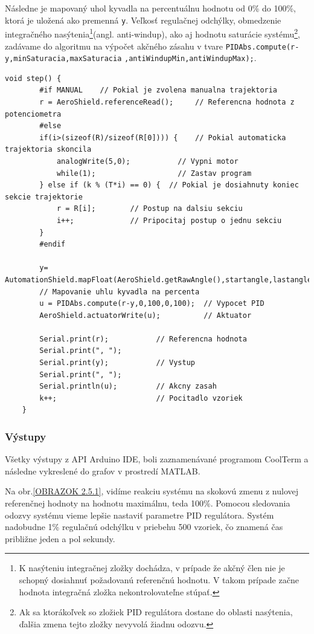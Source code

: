 Následne je mapovaný uhol kyvadla na percentuálnu hodnotu od 0\% do 100\%, ktorá je uložená ako premenná \verb|y|. Veľkosť regulačnej odchýlky, obmedzenie integračného nasýtenia\footnote[11]{K nasýteniu integračnej zložky dochádza, v prípade že akčný člen nie je schopný dosiahnuť požadovanú referenčnú
	hodnotu. V takom prípade začne hodnota integračná zložka nekontrolovateľne stúpať.}(angl. anti-windup), ako aj hodnotu saturácie systému\footnote[12]{Ak sa ktorákoľvek so zložiek PID regulátora dostane do oblasti nasýtenia, ďalšia zmena tejto zložky nevyvolá žiadnu odozvu.}, zadávame do algoritmu na výpočet akčného zásahu v tvare \verb|PIDAbs.compute(r-y,minSaturacia,maxSaturacia|
\verb|,antiWindupMin,antiWindupMax);|. 


\begin{lstlisting}[caption={Funkcia step().},captionpos=b]
	void step() {            
		#if MANUAL    // Pokial je zvolena manualna trajektoria 
		r = AeroShield.referenceRead();     // Referencna hodnota z potenciometra
		#else         
		if(i>(sizeof(R)/sizeof(R[0]))) {    // Pokial automaticka trajektoria skoncila
			analogWrite(5,0);           // Vypni motor
			while(1);                   // Zastav program
		} else if (k % (T*i) == 0) {  // Pokial je dosiahnuty koniec       sekcie trajektorie
			r = R[i];        // Postup na dalsiu sekciu
			i++;             // Pripocitaj postup o jednu sekciu 
		}
		#endif
		
		y= AutomationShield.mapFloat(AeroShield.getRawAngle(),startangle,lastangle,0.00,100.00);
		// Mapovanie uhlu kyvadla na percenta 
		u = PIDAbs.compute(r-y,0,100,0,100);  // Vypocet PID 
		AeroShield.actuatorWrite(u);          // Aktuator
		
		Serial.print(r);           // Referencna hodnota 
		Serial.print(", ");
		Serial.print(y);           // Vystup 
		Serial.print(", ");
		Serial.println(u);         // Akcny zasah 
		k++;                       // Pocitadlo vzoriek 
	}
\end{lstlisting}

\subsubsection{Výstupy}

Všetky výstupy z API Arduino IDE, boli zaznamenávané programom CoolTerm a následne vykreslené do grafov v prostredí MATLAB. 

Na obr.\ref{OBRAZOK 2.5.1}, vidíme reakciu systému na skokovú zmenu z nulovej referenčnej hodnoty na hodnotu maximálnu, teda 100\%. Pomocou sledovania odozvy systému vieme lepšie nastaviť parametre PID regulátora. Systém nadobudne 1\% regulačnú odchýlku v priebehu 500 vzoriek, čo znamená čas približne jeden a pol sekundy. 

